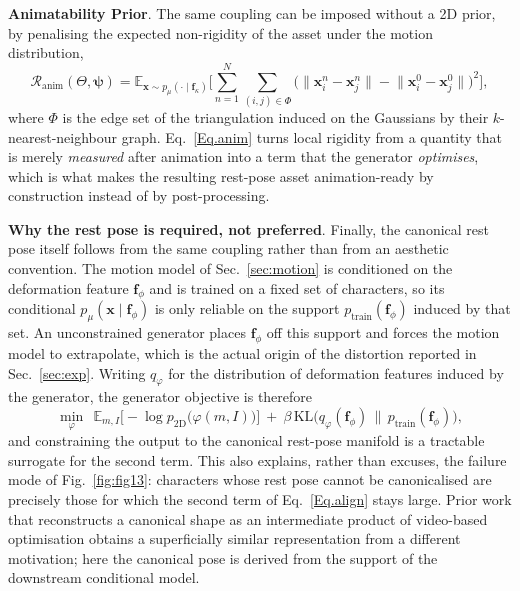 \documentclass[lettersize,journal]{IEEEtran}
\begin{document}
\textbf{Animatability Prior}. The same coupling can be imposed without a 2D prior, by
penalising the expected non-rigidity of the asset under the motion distribution,
\begin{equation} \label{Eq.anim}
\mathcal{R}_{\text{anim}}(\Theta,\bm{\psi})=
\mathbb{E}_{\bm{x}\sim p_{\mu}(\cdot\mid\bm{f}_{\kappa})}
\Big[\sum_{n=1}^{N}\sum_{(i,j)\in\Phi}
\big(\lVert\mathbf{x}_{i}^{n}-\mathbf{x}_{j}^{n}\rVert-
\lVert\mathbf{x}_{i}^{0}-\mathbf{x}_{j}^{0}\rVert\big)^{2}\Big],
\end{equation}
where $\Phi$ is the edge set of the triangulation induced on the Gaussians by their
$k$-nearest-neighbour graph. Eq.~\ref{Eq.anim} turns local rigidity from a quantity that is
merely \textit{measured} after animation into a term that the generator \textit{optimises},
which is what makes the resulting rest-pose asset animation-ready by construction instead of
by post-processing.

\textbf{Why the rest pose is required, not preferred}. Finally, the canonical rest pose itself
follows from the same coupling rather than from an aesthetic convention. The motion model
of Sec.~\ref{sec:motion} is conditioned on the deformation feature $\bm{f}_{\phi}$ and is
trained on a fixed set of characters, so its conditional $p_{\mu}(\bm{x}\mid\bm{f}_{\phi})$
is only reliable on the support $p_{\text{train}}(\bm{f}_{\phi})$ induced by that set. An
unconstrained generator places $\bm{f}_{\phi}$ off this support and forces the motion model to
extrapolate, which is the actual origin of the distortion reported in Sec.~\ref{sec:exp}.
Writing $q_{\varphi}$ for the distribution of deformation features induced by the generator,
the generator objective is therefore
\begin{equation} \label{Eq.align}
\min_{\varphi}\ \
\mathbb{E}_{m,I}\big[-\log p_{\text{2D}}\big(\varphi(m,I)\big)\big]
\ +\ \beta\,\mathrm{KL}\big(q_{\varphi}(\bm{f}_{\phi})\,\big\|\,p_{\text{train}}(\bm{f}_{\phi})\big),
\end{equation}
and constraining the output to the canonical rest-pose manifold is a tractable surrogate for
the second term. This also explains, rather than excuses, the failure mode of
Fig.~\ref{fig:fig13}: characters whose rest pose cannot be canonicalised are precisely those
for which the second term of Eq.~\ref{Eq.align} stays large. Prior work that reconstructs a
canonical shape as an intermediate product of video-based optimisation
\cite{wu2026rdmesh,mou2025dimo} obtains a superficially similar representation from a
different motivation; here the canonical pose is derived from the support of the downstream
conditional model.
\end{document}
